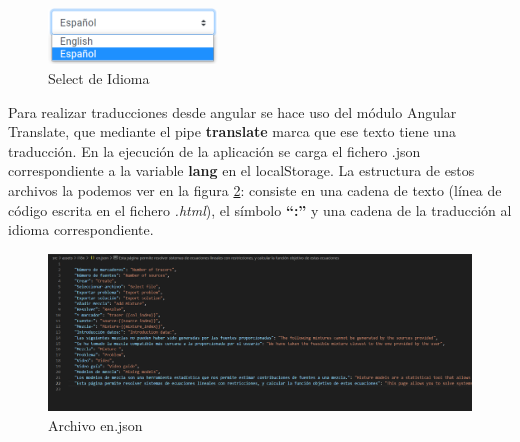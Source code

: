 \begin{figure}[h!] 
\centering
    \includegraphics[width=0.4\textwidth]{img/selectIdiom.PNG}
\caption{Select de Idioma}
\label{fig:selectidiom}
\end{figure}

\newpage
Para realizar traducciones desde angular se hace uso del módulo Angular Translate, que mediante el pipe \textbf{translate} marca que ese texto tiene una traducción. En la ejecución de la aplicación se carga el fichero .json correspondiente a la variable \textbf{lang} en el localStorage. La estructura de estos archivos la podemos ver en la figura \ref{fig:en_json}: consiste en una cadena de texto (línea de código escrita en el fichero \emph{.html}), el símbolo \textbf{``:''} y una cadena de la traducción al idioma correspondiente.

\begin{figure}[h!] 
\centering
    \includegraphics[width=1\textwidth]{img/en_json.PNG}
\caption{Archivo en.json}
\label{fig:en_json}
\end{figure}








